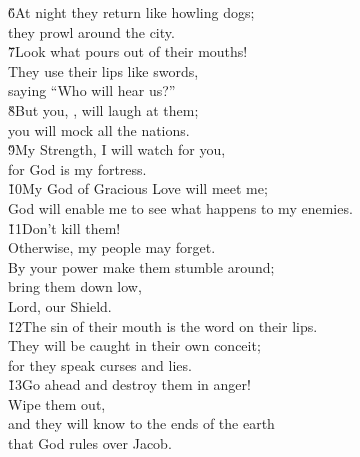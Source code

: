 \begin{poetry}
\poeml \v{6}At night they return like howling dogs; \\
\poemll    they prowl around the city. \\
\poeml \v{7}Look what pours out of their mouths! \\
\poemll    They use their lips like swords, \\
\poemlll       saying ``Who will hear us?'' \\
\poeml \v{8}But you, , will laugh at them; \\
\poemll    you will mock all the nations. \\
\poeml \v{9}My Strength, I will watch for you, \\
\poemll    for God is my fortress. \\
\poeml \v{10}My God of Gracious Love will meet me; \\
\poemll    God will enable me to see what happens to my enemies. \\
\poeml \v{11}Don't kill them! \\
\poemll    Otherwise, my people may forget. \\
\poeml By your power make them stumble around; \\
\poemll    bring them down low, \\
\poemlll       Lord, our Shield. \\
\poeml \v{12}The sin of their mouth is the word on their lips. \\
\poemll    They will be caught in their own conceit; \\
\poemlll       for they speak curses and lies. \\
\poeml \v{13}Go ahead and destroy them in anger! \\
\poemll    Wipe them out, \\
\poeml and they will know to the ends of the earth \\
\poemll    that God rules over Jacob.
\end{poetry}

